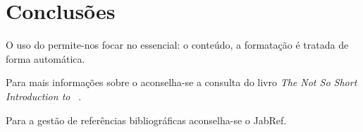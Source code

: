 

\chapter{Conclusões}
\label{ch:conclusoes}


O uso do \LaTeXe permite-nos focar no essencial: o conteúdo, a formatação é tratada de forma automática.

Para mais informações sobre o \LaTeXe aconselha-se a consulta do
livro \emph{The Not So Short Introduction to \LaTeXe}~\cite{oetiker2000nss}.

Para a gestão de referências bibliográficas aconselha-se o JabRef. %
